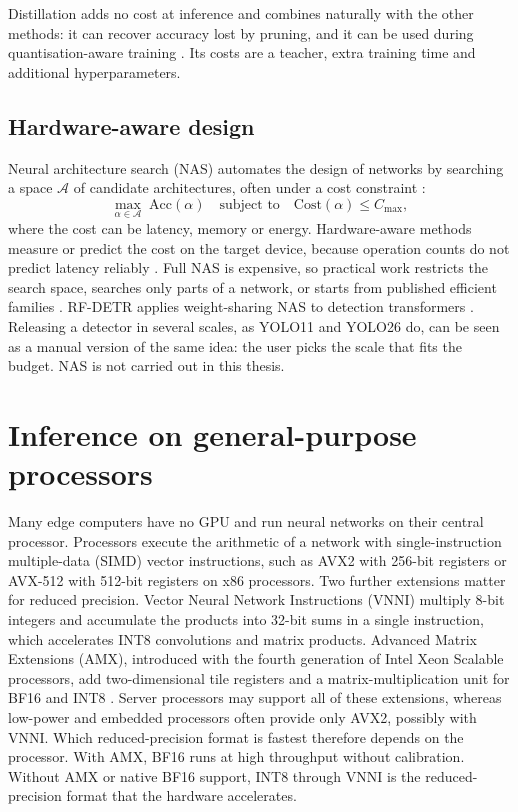\documentclass[a4paper,11pt,twoside]{report}
\theoremstyle{definition}
\begin{document}
Distillation adds no cost at inference and combines naturally with the other methods: it can recover accuracy lost by pruning, and it can be used during quantisation-aware training \cite{Cheng2017SurveyCompression}. Its costs are a teacher, extra training time and additional hyperparameters.

\subsection{Hardware-aware design}
\label{sec:rw_nas}

Neural architecture search (NAS) automates the design of networks by searching a space $\mathcal{A}$ of candidate architectures, often under a cost constraint \cite{Cai2019ProxylessNAS}:
\begin{equation}
\max_{\alpha \in \mathcal{A}} \; \mathrm{Acc}(\alpha)
\quad \text{subject to} \quad
\mathrm{Cost}(\alpha) \le C_{\max},
\label{eq:nas_constraint}
\end{equation}
where the cost can be latency, memory or energy. Hardware-aware methods measure or predict the cost on the target device, because operation counts do not predict latency reliably \cite{Cai2019ProxylessNAS}. Full NAS is expensive, so practical work restricts the search space, searches only parts of a network, or starts from published efficient families \cite{Tan2020EfficientDet}. RF-DETR applies weight-sharing NAS to detection transformers \cite{Robinson2025RFDETR}. Releasing a detector in several scales, as YOLO11 and YOLO26 do, can be seen as a manual version of the same idea: the user picks the scale that fits the budget. NAS is not carried out in this thesis.

\section{Inference on general-purpose processors}
\label{sec:rw_cpu}

Many edge computers have no GPU and run neural networks on their central processor. Processors execute the arithmetic of a network with single-instruction multiple-data (SIMD) vector instructions, such as AVX2 with 256-bit registers or AVX-512 with 512-bit registers on x86 processors. Two further extensions matter for reduced precision. Vector Neural Network Instructions (VNNI) multiply 8-bit integers and accumulate the products into 32-bit sums in a single instruction, which accelerates INT8 convolutions and matrix products. Advanced Matrix Extensions (AMX), introduced with the fourth generation of Intel Xeon Scalable processors, add two-dimensional tile registers and a matrix-multiplication unit for BF16 and INT8 \cite{Nassif2022SapphireRapids}. Server processors may support all of these extensions, whereas low-power and embedded processors often provide only AVX2, possibly with VNNI. Which reduced-precision format is fastest therefore depends on the processor. With AMX, BF16 runs at high throughput without calibration. Without AMX or native BF16 support, INT8 through VNNI is the reduced-precision format that the hardware accelerates.
\end{document}
